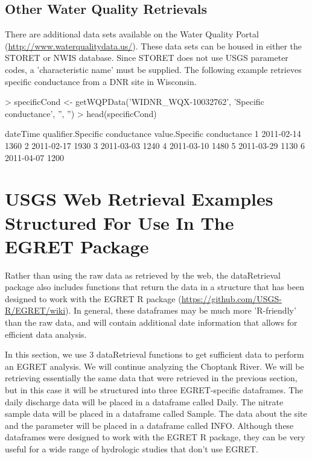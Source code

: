 \documentclass[a4paper,11pt]{article}
\begin{document}
\subsection{Other Water Quality Retrievals}
\label{sec:usgsSTORET}
There are additional data sets available on the Water Quality Portal (\url{http://www.waterqualitydata.us/}).  These data sets can be housed in either the STORET or NWIS database.  Since STORET does not use USGS parameter codes, a 'characteristic name' must be supplied.  The following example retrieves specific conductance from a DNR site in Wisconsin.

\begin{Schunk}
\begin{Sinput}
> specificCond <- getWQPData('WIDNR_WQX-10032762', 
         'Specific conductance', '', '')
> head(specificCond)
\end{Sinput}
\begin{Soutput}
    dateTime qualifier.Specific conductance value.Specific conductance
1 2011-02-14                                                      1360
2 2011-02-17                                                      1930
3 2011-03-03                                                      1240
4 2011-03-10                                                      1480
5 2011-03-29                                                      1130
6 2011-04-07                                                      1200
\end{Soutput}
\end{Schunk}


\section{USGS Web Retrieval Examples Structured For Use In The EGRET Package}
Rather than using the raw data as retrieved by the web, the dataRetrieval package also includes functions that return the data in a structure that has been designed to work with the EGRET R package (\url{https://github.com/USGS-R/EGRET/wiki}). In general, these dataframes may be much more 'R-friendly' than the raw data, and will contain additional date information that allows for efficient data analysis.

In this section, we use 3 dataRetrieval functions to get sufficient data to perform an EGRET analysis.  We will continue analyzing the Choptank River. We will be retrieving essentially the same data that were retrieved in the previous section, but in this case it will be structured into three EGRET-specific dataframes.  The daily discharge data will be placed in a dataframe called Daily.  The nitrate sample data will be placed in a dataframe called Sample.  The data about the site and the parameter will be placed in a dataframe called INFO.  Although these dataframes were designed to work with the EGRET R package, they can be very useful for a wide range of hydrologic studies that don't use EGRET.
\end{document}
